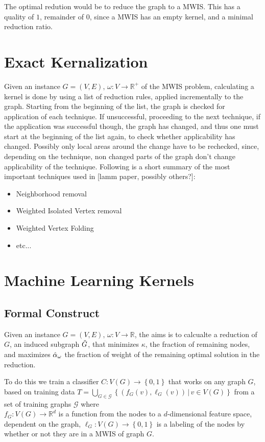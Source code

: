 \documentclass[acmsmall,nonacm,screen,review]{acmart}
\newcommand{\set}[1]{\left\{ #1\right\}}
\newcommand{\ra}{\rightarrow}
\newcommand{\R}{\mathbb{R}}
\begin{document}
The optimal redution would be to reduce the graph to a MWIS.
This has a quality of $1$, remainder of $0$, since a MWIS has an empty kernel, and a minimal reduction ratio.

\section{Exact Kernalization}
Given an instance $G=(V,E),\, \omega : V \ra \R^+$ of the MWIS problem, calculating a kernel is done by using a list of reduction rules, applied incrementally to the graph. 
Starting from the beginning of the list, the graph is checked for application of each technique. If unsuccessful, proceeding to the next technique, if the application was successful though, the graph has changed, and thus one must start at the beginning of the list again, to check whether applicability has changed. Possibly only local areas around the change have to be rechecked, since, depending on the technique, non changed parts of the graph don't change applicability of the technique.
Following is a short summary of the most important techniques used in [lamm paper, possibly others?]:

\begin{itemize}
    \item Neighborhood removal
    \item Weighted Isolated Vertex removal
    \item Weighted Vertex Folding
    \item etc...
\end{itemize}

\section{Machine Learning Kernels}  %
\subsection{Formal Construct}
Given an instance $G=(V,E), \, \omega: V \ra \R$, the aims is to calcualte a reduction of $G$, an induced subgraph $\Tilde{G}$, that minimizes $\kappa$, the fraction of remaining nodes, and maximizes $\Hat{\alpha}_\omega$ the fraction of weight of the remaining optimal solution in the reduction.

To do this we train a classifier $C : V(G) \ra \set{0,1}$ that works on any graph $G$, based on training data $T=\bigcup_{G\in \mathcal{G}} \set{(f_G(v), \ell_G(v)) \, | \, v \in V(G)}$ from a set of training graphs $\mathcal{G}$ where \\ $f_{G}: V(G) \ra \R^d$ is a function from the nodes to a $d$-dimensional feature space, dependent on the graph, $\ell_G : V(G) \ra \set{0,1}$ is a labeling of the nodes by whether or not they are in a MWIS of graph $G$.
\end{document}
